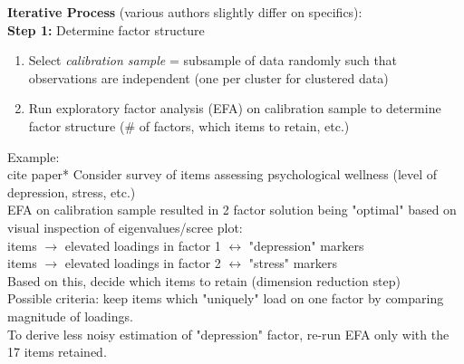 \documentclass[12pt]{article}
\begin{document}
\noindent \textbf{Iterative Process} (various authors slightly differ on specifics):\\
\noindent \textbf{Step 1:} Determine factor structure
\begin{enumerate}
\item Select \textit{calibration sample} = subsample of data randomly such that observations are independent (one per cluster for clustered data)
\item Run exploratory factor analysis (EFA) on calibration sample to determine factor structure (\# of factors, which items to retain, etc.)
\end{enumerate}

\noindent Example:\\
\noindent *cite paper* Consider survey of items assessing psychological wellness (level of depression, stress, etc.)\\

\noindent EFA on calibration sample resulted in 2 factor solution being "optimal" based on visual inspection of eigenvalues/scree plot:\\

 items $\rightarrow$ elevated loadings in factor 1 $\leftrightarrow$ "depression" markers\\
 items $\rightarrow$ elevated loadings in factor 2 $\leftrightarrow$ "stress" markers\\

\noindent Based on this, decide which items to retain (dimension reduction step)\\
Possible criteria: keep items which "uniquely" load on one factor by comparing magnitude of loadings.\\
\noindent To derive less noisy estimation of "depression" factor, re-run EFA only with the 17 items retained.\\
\end{document}
